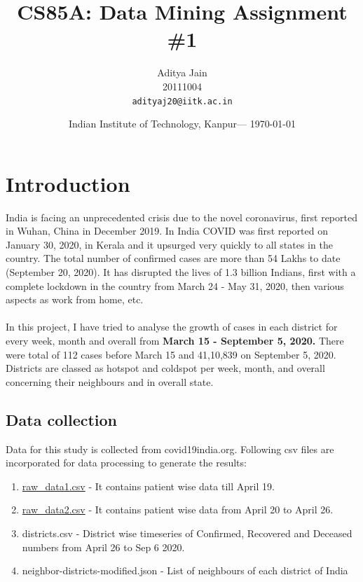 \documentclass{article}
\title{CS85A: Data Mining Assignment \#1 } %
\author{Aditya Jain\\ 20111004   \\\texttt{adityaj20@iitk.ac.in}} %
\date{Indian Institute of Technology, Kanpur--- \today} %
\begin{document}
\maketitle %


\section{Introduction} %

India is facing an unprecedented crisis due to the novel coronavirus, first reported in Wuhan, China in December 2019. In India COVID was first reported on January 30, 2020, in Kerala and it upsurged very quickly to all states in the country. The total number of confirmed cases are more than 54 Lakhs to date (September 20, 2020). It has disrupted the lives of 1.3 billion Indians, first with a complete lockdown in the country from March 24 - May 31, 2020, then various aspects as work from home, etc.\\\\

In this project, I have tried to analyse the growth of cases in each district for every week, month and overall from \textbf{March 15 - September 5, 2020.} There were total of 112 cases before March 15 and 41,10,839 on September 5, 2020. Districts are classed as hotspot and coldspot per week, month, and overall concerning their neighbours and in overall state.  

\subsection{Data collection}

Data for this study is collected from covid19india.org. Following csv files are incorporated for data processing to generate the results: 
\begin{enumerate}
    \item \href{https://api.covid19india.org/csv/latest/raw\_data1.csv}{raw\_data1.csv} - It contains patient wise data till April 19.
    \item \href{https://api.covid19india.org/csv/latest/raw\_data2.csv}{raw\_data2.csv} - It contains patient wise data from April 20 to April 26.
    \item districts.csv - District wise timeseries of Confirmed, Recovered and Deceased numbers from April 26 to Sep 6 2020.
    \item neighbor-districts-modified.json - List of neighbours of each district of India
\end{enumerate}
\end{document}
